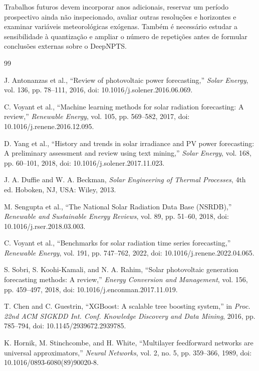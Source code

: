 \documentclass[10pt,conference,a4paper]{IEEEtran}
\begin{document}
Trabalhos futuros devem incorporar anos adicionais, reservar um período
prospectivo ainda não inspecionado, avaliar outras resoluções e horizontes e
examinar variáveis meteorológicas exógenas. Também é necessário estudar a
sensibilidade à quantização e ampliar o número de repetições antes de formular
conclusões externas sobre o DeepNPTS.

\begin{thebibliography}{99}

J. Antonanzas et al., ``Review of photovoltaic power forecasting,''
\textit{Solar Energy}, vol. 136, pp. 78--111, 2016,
doi: 10.1016/j.solener.2016.06.069.

C. Voyant et al., ``Machine learning methods for solar radiation forecasting:
A review,'' \textit{Renewable Energy}, vol. 105, pp. 569--582, 2017,
doi: 10.1016/j.renene.2016.12.095.

D. Yang et al., ``History and trends in solar irradiance and PV power
forecasting: A preliminary assessment and review using text mining,''
\textit{Solar Energy}, vol. 168, pp. 60--101, 2018,
doi: 10.1016/j.solener.2017.11.023.

J. A. Duffie and W. A. Beckman, \textit{Solar Engineering of Thermal
Processes}, 4th ed. Hoboken, NJ, USA: Wiley, 2013.

M. Sengupta et al., ``The National Solar Radiation Data Base (NSRDB),''
\textit{Renewable and Sustainable Energy Reviews}, vol. 89, pp. 51--60, 2018,
doi: 10.1016/j.rser.2018.03.003.

C. Voyant et al., ``Benchmarks for solar radiation time series forecasting,''
\textit{Renewable Energy}, vol. 191, pp. 747--762, 2022,
doi: 10.1016/j.renene.2022.04.065.

S. Sobri, S. Koohi-Kamali, and N. A. Rahim, ``Solar photovoltaic generation
forecasting methods: A review,'' \textit{Energy Conversion and Management},
vol. 156, pp. 459--497, 2018, doi: 10.1016/j.enconman.2017.11.019.

T. Chen and C. Guestrin, ``XGBoost: A scalable tree boosting system,'' in
\textit{Proc. 22nd ACM SIGKDD Int. Conf. Knowledge Discovery and Data Mining},
2016, pp. 785--794, doi: 10.1145/2939672.2939785.

K. Hornik, M. Stinchcombe, and H. White, ``Multilayer feedforward networks are
universal approximators,'' \textit{Neural Networks}, vol. 2, no. 5,
pp. 359--366, 1989, doi: 10.1016/0893-6080(89)90020-8.


\end{thebibliography}
\end{document}
